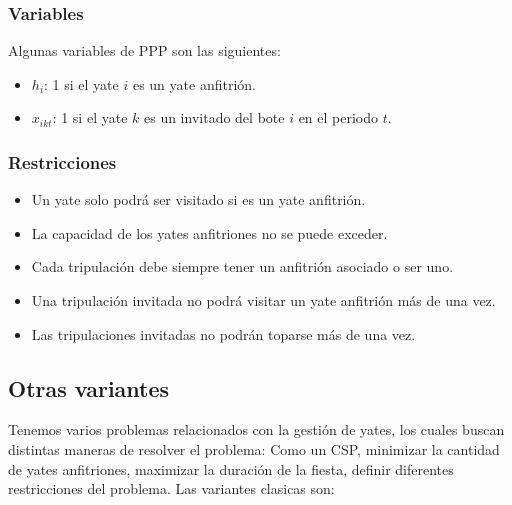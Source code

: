 \documentclass[letter, 10pt]{article}
\begin{document}
\subsubsection{Variables}
Algunas variables de PPP son las siguientes:

    \begin{itemize}
      \item $h_i$: 1 si el yate $i$ es un yate anfitrión.
      \item $x_{ikt}$: 1 si el yate $k$ es un invitado del bote $i$ en el periodo $t$.
    \end{itemize}

\subsubsection{Restricciones}
\begin{itemize}
\item Un yate solo podrá ser visitado si es un yate anfitrión.
\item La capacidad de los yates anfitriones no se puede exceder.
\item Cada tripulación debe siempre tener un anfitrión asociado o ser uno.
\item Una tripulación invitada no podrá visitar un yate anfitrión más de una vez.
\item Las tripulaciones invitadas no podrán toparse más de una vez.
\end{itemize}

\subsection{Otras variantes}
Tenemos varios problemas relacionados con la gestión de yates, los cuales buscan distintas maneras de resolver el problema: Como un CSP, minimizar la cantidad de yates anfitriones, maximizar la duración de la fiesta, definir diferentes restricciones del problema. Las variantes clasicas son:
\end{document}
